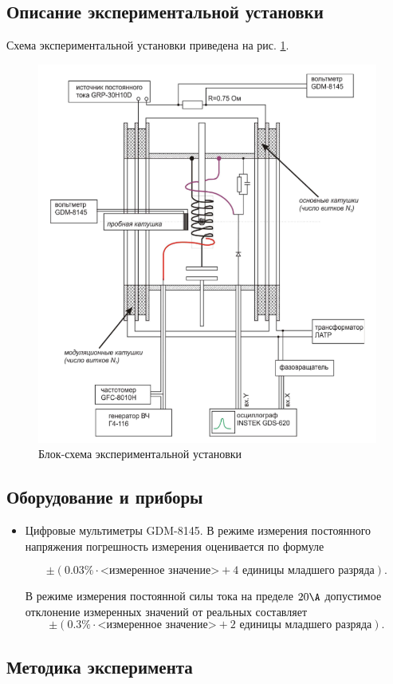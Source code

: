 \documentclass[a4paper, 12pt]{article}
\begin{document}
    \subsection{Описание экспериментальной установки}

    Схема экспериментальной установки приведена на рис. \ref{fig:installation}.

    \begin{figure}[H]
        \centering
        \includegraphics[width = 0.5\linewidth]{images/installation.png}
        \caption{Блок-схема экспериментальной установки}
        \label{fig:installation}
    \end{figure}

    \subsection{Оборудование и приборы}

    \begin{itemize}
        \item Цифровые мультиметры GDM-8145. В режиме измерения постоянного напряжения погрешность измерения оценивается по формуле 
        
        $$
        \pm (0.03\% \cdot \text{<измеренное значение>} + 4 \text{ единицы младшего разряда}).
        $$
        
        В режиме измерения постоянной силы тока на пределе $20 \A$ допустимое отклонение измеренных значений от реальных составляет 
        $$
        \pm (0.3\% \cdot \text{<измеренное значение>} + 2\text{ единицы младшего разряда}).
        $$
    \end{itemize}
	
    \subsection{Методика эксперимента}
\end{document}
